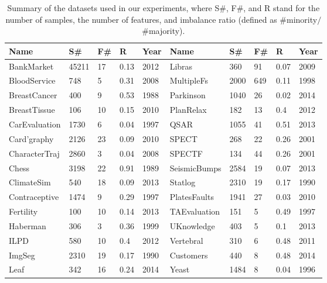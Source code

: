 \documentclass{iitthesis}
\begin{document}
\begin{table}[ht]
\caption{Summary of the datasets used in our experiments, where S\#, F\#, and R stand for the number of samples, the number of features, and imbalance ratio (defined as \#minority$/$\#majority).}
\begin{center}
\scalebox{0.93}
{
\begin{tabular}{llllllllll}
\hline \hline
Name & S\# & F\# & R & Year & Name & S\# & F\# & R & Year \\
\hline
BankMarket & 45211 & 17 & 0.13 & 2012 & Libras & 360 & 91 & 0.07 & 2009 \\
BloodService & 748 & 5 & 0.31 & 2008 & MultipleFs & 2000 & 649 & 0.11 & 1998 \\
BreastCancer & 400 & 9 & 0.53 & 1988 & Parkinson & 1040 & 26 & 0.02 & 2014 \\
BreastTissue & 106 & 10 & 0.15 & 2010 & PlanRelax & 182 & 13 & 0.4 & 2012 \\
CarEvaluation & 1730 & 6 & 0.04 & 1997 & QSAR & 1055 & 41 & 0.51 & 2013 \\
Card'graphy & 2126 & 23 & 0.09 & 2010 & SPECT & 268 & 22 & 0.26 & 2001 \\
CharacterTraj & 2860 & 3 & 0.04 & 2008 & SPECTF & 134 & 44 & 0.26 & 2001 \\
Chess & 3198 & 22 & 0.91 & 1989 & SeismicBumps & 2584 & 19 & 0.07 & 2013 \\
ClimateSim & 540 & 18 & 0.09 & 2013 & Statlog & 2310 & 19 & 0.17 & 1990 \\
Contraceptive & 1474 & 9 & 0.29 & 1997 & PlatesFaults & 1941 & 27 & 0.03 & 2010 \\
Fertility & 100 & 10 & 0.14 & 2013 & TAEvaluation & 151 & 5 & 0.49 & 1997 \\
Haberman & 306 & 3 & 0.36 & 1999 & UKnowledge & 403 & 5 & 0.1 & 2013 \\
ILPD & 580 & 10 & 0.4 & 2012 & Vertebral & 310 & 6 & 0.48 & 2011 \\
ImgSeg & 2310 & 19 & 0.17 & 1990 & Customers & 440 & 8 & 0.48 & 2014 \\
Leaf & 342 & 16 & 0.24 & 2014 & Yeast & 1484 & 8 & 0.04 & 1996 \\ \hline 
\end{tabular}
}
\end{center}
\label{tab: realdata}
\end{table}
\end{document}
